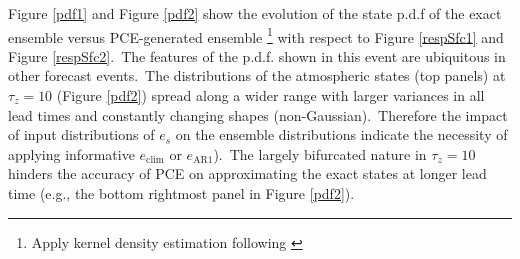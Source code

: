 			Figure {\ref{pdf1}} and Figure {\ref{pdf2}} show 
			the evolution of the state p.d.f of the exact ensemble versus PCE-generated ensemble
			\footnote{Apply kernel density estimation following {\citet{Botev10}} } 
			with respect to Figure {\ref{respSfc1}} and Figure {\ref{respSfc2}}.\
			The features of the p.d.f. shown in this event are ubiquitous in other forecast events.\
			The distributions of the atmospheric states (top panels) 
			at $\tau_z=10$ (Figure {\ref{pdf2}}) spread along 
			a wider range with larger variances
			in all lead times and constantly changing shapes (non-Gaussian).\
			Therefore the impact of input distributions of $e_s$ on the ensemble distributions
			indicate the necessity of applying informative $e_{\text{clim}}$ or $e_{\text{AR1}}$).\
			The largely bifurcated nature in $\tau_z=10$ hinders the accuracy of
			PCE on approximating the exact states at longer lead time
			(e.g., the bottom rightmost panel in Figure {\ref{pdf2}}).\
						
 

			
